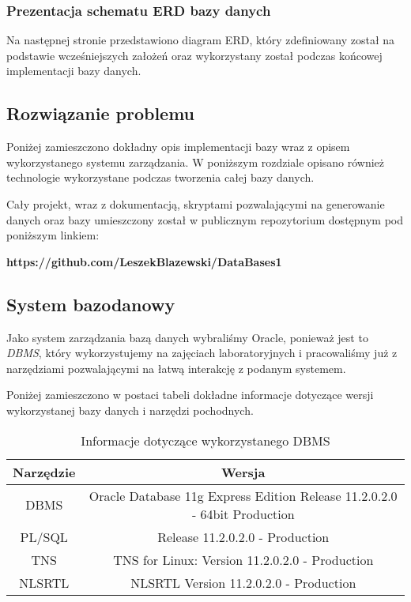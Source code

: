\documentclass[a4paper]{article}
\begin{document}
\subsubsection{Prezentacja schematu ERD bazy danych}

Na następnej stronie przedstawiono diagram ERD, który zdefiniowany został na podstawie wcześniejszych założeń oraz wykorzystany został podczas końcowej implementacji bazy danych.

\newpage


\subsection{Rozwiązanie problemu}

Poniżej zamieszczono dokładny opis implementacji bazy wraz z opisem wykorzystanego systemu zarządzania. W poniższym rozdziale opisano również technologie wykorzystane podczas tworzenia całej bazy danych.

Cały projekt, wraz z dokumentacją, skryptami pozwalającymi na generowanie danych oraz bazy umieszczony został w publicznym repozytorium dostępnym pod poniższym linkiem:
\begin{center}
\textbf{https://github.com/LeszekBlazewski/DataBases1}
\end{center}{}


\subsection{System bazodanowy}

Jako system zarządzania bazą danych wybraliśmy Oracle, ponieważ jest to\textit{ DBMS}, który wykorzystujemy na zajęciach laboratoryjnych i pracowaliśmy już z narzędziami pozwalającymi na łatwą interakcję z podanym systemem.

Poniżej zamieszczono w postaci tabeli dokładne informacje dotyczące wersji wykorzystanej bazy danych i narzędzi pochodnych.

\begin{table}[h!]
\centering
\begin{tabular}{|c|c|}
\hline
\textbf{Narzędzie} & \textbf{Wersja}                                                           \\ \hline
DBMS               & Oracle Database 11g Express Edition Release 11.2.0.2.0 - 64bit Production \\ \hline
PL/SQL             & Release 11.2.0.2.0 - Production                                           \\ \hline
TNS                & TNS for Linux: Version 11.2.0.2.0 - Production                            \\ \hline
NLSRTL             & NLSRTL Version 11.2.0.2.0 - Production                                    \\ \hline
\end{tabular}
\caption{Informacje dotyczące wykorzystanego DBMS}
\label{tab:my-table}
\end{table}
\end{document}
